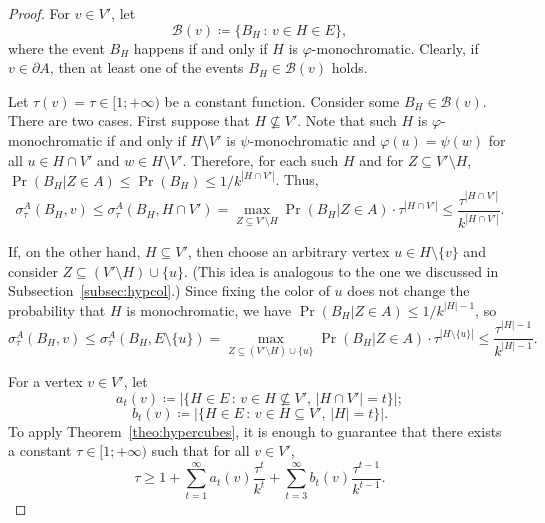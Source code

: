\documentclass[10pt]{article}
\numberwithin{equation}{subsection}
\theoremstyle{definition}
\begin{document}
\begin{proof}
		For $v \in V'$, let
		$$
			\mathcal{B}(v) \coloneqq \{B_H \,:\, v \in H \in E\},
		$$
		where the event $B_H$ happens if and only if $H$ is $\varphi$-monochromatic. Clearly, if $v \in \partial A$, then at least one of the events $B_H \in \mathcal{B}(v)$ holds.
		
		Let $\tau(v) = \tau \in [1;+\infty)$ be a constant function. Consider some $B_H \in \mathcal{B}(v)$. There are two cases. First suppose that $H \not \subseteq V'$. Note that such $H$ is $\varphi$-monochromatic if and only if $H \setminus V'$ is $\psi$-monochromatic and $\varphi(u) = \psi(w)$ for all $u \in H \cap V'$ and $w \in H\setminus V'$. Therefore, for each such $H$ and for $Z \subseteq V' \setminus H$, $\Pr(B_H \vert Z \in A) \leq \Pr(B_H) \leq 1/k^{|H \cap V'|}$.
		Thus,
		$$
			\sigma^A_\tau(B_H, v) \leq \sigma^A_\tau(B_H, H\cap V') = \max_{Z \subseteq V' \setminus H} \Pr(B_H \vert Z \in A) \cdot \tau^{|H \cap V'|} \leq \frac{\tau^{|H \cap V'|}}{k^{|H \cap V'|}}.
		$$
		
		If, on the other hand, $H \subseteq V'$, then choose an arbitrary vertex $u \in H \setminus \{v\}$ and consider $Z \subseteq (V' \setminus H) \cup \{u\}$. (This idea is analogous to the one we discussed in Subsection~\ref{subsec:hypcol}.) Since fixing the color of $u$ does not change the probability that $H$ is monochromatic, we have $\Pr(B_H \vert Z \in A) \leq 1/k^{|H|-1}$, so
		$$
			\sigma^A_\tau(B_H, v) \leq \sigma^A_\tau(B_H, E \setminus \{u\}) = \max_{Z \subseteq (V' \setminus H) \cup \{u\}} \Pr(B_H \vert Z \in A) \cdot \tau^{|H \setminus \{u\}|} \leq \frac{\tau^{|H|-1}}{k^{|H|-1}}.
		$$
		
		For a vertex $v \in V'$, let
		$$
			a_t(v) \coloneqq |\{H \in E\,:\, v \in H \not\subseteq V', \,|H\cap V'| = t\}|;
		$$
		$$
			b_t(v) \coloneqq |\{H \in E\,:\, v \in H\subseteq V',\, |H| = t\}|.
		$$
		To apply Theorem~\ref{theo:hypercubes}, it is enough to guarantee that there exists a constant $\tau \in [1; +\infty)$ such that for all $v \in V'$,
		\begin{equation}\label{eq:requirement}
			\tau \geq 1 + \sum_{t = 1}^\infty a_t(v) \frac{\tau^t}{k^t} + \sum_{t = 3}^\infty b_t(v) \frac{\tau^{t-1}}{k^{t-1}}.
		\end{equation}
		

\end{proof}
\end{document}
